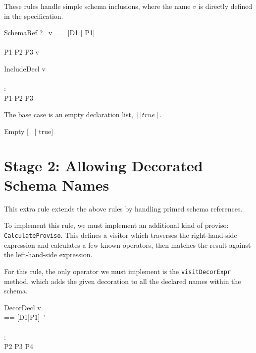 \documentclass{article}
\begin{document}
These rules handle simple schema inclusions, where the name $v$ is
directly defined in the specification.

\begin{zedrule}{SchemaRef}
  \proviso ?~ v == [D1 | P1] \\
  [D1 | true] \unfoldsTo [D2 | P2] \\
  P1 \land P2 \iff P3
\derives
  v \unfoldsTo [D2 | P3]
\end{zedrule}


\begin{zedrule}{IncludeDecl}
   v \unfoldsTo [D1 | P1] \\
   [D | true] \unfoldsTo [D2 | P2] \\
   \proviso [D1 | true] \land [D2 | true] : \power [D3] \\
   P1 \land P2 \iff P3
\derives
   [v; D | true] \unfoldsTo [D3 | P3]
\end{zedrule}

The base case is an empty declaration list, $[|true]$.
\begin{zedrule}{Empty}
   [~ | true] \unfoldsTo [~ | true]
\end{zedrule}


\section*{Stage 2: Allowing Decorated Schema Names}

This extra rule extends the above rules by handling primed schema
references.

To implement this rule, we must implement an additional kind of
proviso: \verb!CalculateProviso!.  This defines a visitor which
traverses the right-hand-side expression and calculates a few known
operators, then matches the result against the left-hand-side expression.

For this rule, the only operator we must implement is the
\verb!visitDecorExpr! method, which adds the given decoration to all the
declared names within the schema.

\begin{zedrule}{DecorDecl}
   v \unfoldsTo [D1 | P1] \\
   \proviso [D2|P2] == [D1|P1]~' \\
   [D | true] \unfoldsTo [D3 | P3] \\
   \proviso [D2 | true] \land [D3 | true] : \power [D4] \\
   P2 \land P3 \iff P4
\derives
   [v~'; D | true] \unfoldsTo [D4 | P4]
\end{zedrule}
\end{document}
